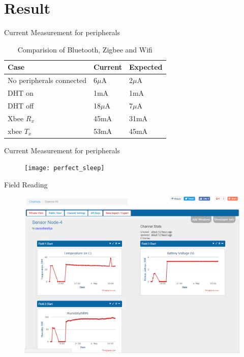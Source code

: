 \documentclass[t]{beamer} %
\begin{document}
\section{Result}
\begin{frame}{Current Measurement for peripherals}
\begin{table}[!h]
	\caption{Comparision of Bluetooth, Zigbee and Wifi }
	\label{Effect of data sampling frequency on Disaggregration}
	\centering
	\begin{tabular}{|L|L|L|}
		\hline
		Case & Current & Expected\\
        \hline
        No peripherals connected & 6$\mu$A & 2$\mu$A \\
        \hline
        DHT on & 1mA & 1mA \\        
        \hline
        DHT off & 18$\mu$A & 7$\mu$A \\
        \hline
        Xbee $R_x$ & 45mA & 31mA \\
        \hline
        xbee $T_x$ & 53mA & 45mA \\
        \hline
        
	\end{tabular}
\end{table}


\end{frame}

\begin{frame}{Current Measurement for peripherals}

\begin{figure}[!ht]
	\centering
\texttt{[image: perfect\_sleep]}
\label{fig:deep sleep}
\end{figure}
\end{frame}

\begin{frame}{Field Reading}
\begin{figure}[!ht]
	\centering
\includegraphics[scale=0.3]{readings}
\label{fig:SN4_reading}
\end{figure}
\end{frame}
\end{document}
